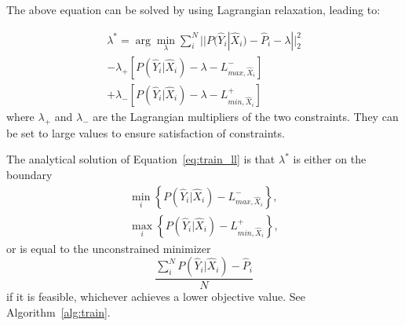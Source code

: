 \documentclass[letterpaper]{article} %
\begin{document}

The above equation can be solved by using Lagrangian relaxation, leading to:

\begin{multline}
\label{eq:train_ll}
\lambda^* = \arg\min_{\lambda}  \sum_i^N ||P(\hat{Y}_i|\hat{X}_i) - \hat{P}_i - \lambda||_2^2 \\
 - \lambda_+ [P(\hat{Y}_i|\hat{X}_i) - \lambda - L^{-}_{max, \hat{X}_i}] \\
 + \lambda_- [ P(\hat{Y}_i|\hat{X}_i) - \lambda  - L^{+}_{min, \hat{X}_i}]
\end{multline}
where $\lambda_+$ and $\lambda_-$ are the Lagrangian multipliers of the two constraints. They can be set to large values to ensure satisfaction of constraints. %
%
%
%
%

The analytical solution of Equation~\ref{eq:train_ll}  is that $\lambda^*$ is either on the boundary
\begin{gather*}
\min_i\left\{P(\hat{Y}_i|\hat{X}_i)-L^{-}_{max, \hat{X}_i}\right\},\\
\max_i\left\{P(\hat{Y}_i|\hat{X}_i)-L^{+}_{min, \hat{X}_i}\right\},
\end{gather*}
or is equal to the unconstrained minimizer
\[
\frac {\sum_i^N  P(\hat{Y}_i|\hat{X}_i) - \hat{P}_i}{N}
\]
if it is feasible, whichever achieves a lower objective value. See Algorithm~\ref{alg:train}.
\end{document}

